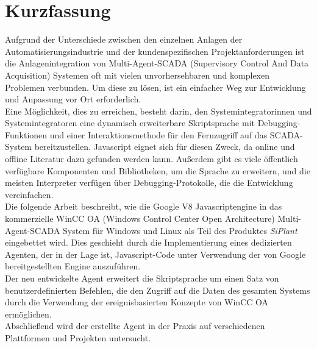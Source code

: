 \chapter{Kurzfassung}

Aufgrund der Unterschiede zwischen den einzelnen Anlagen der Automatisierungsindustrie und der 
kundenspezifischen Projektanforderungen ist die Anlagenintegration von Multi-Agent-SCADA 
(Supervisory Control And Data Acquisition) Systemen oft mit vielen unvorhersehbaren und komplexen Problemen verbunden. 
Um diese zu lösen, ist ein einfacher Weg zur Entwicklung und Anpassung vor Ort erforderlich. \\

Eine Möglichkeit, dies zu erreichen, besteht darin, den Systemintegratorinnen und Systemintegratoren eine dynamisch erweiterbare Skriptsprache mit 
Debugging-Funktionen und einer Interaktionsmethode für den Fernzugriff auf das SCADA-System bereitzustellen.
Javascript eignet sich für diesen Zweck, da online und offline Literatur dazu gefunden werden kann. Außerdem gibt es viele 
öffentlich verfügbare Komponenten und Bibliotheken, um die Sprache zu erweitern, und die meisten Interpreter 
verfügen über Debugging-Protokolle, die die Entwicklung vereinfachen. \\

Die folgende Arbeit beschreibt, wie die Google V8 Javascriptengine in das kommerzielle WinCC OA 
(Windows Control Center Open Architecture) Multi-Agent-SCADA System für Windows und Linux als Teil des
Produktes \textit{SiPlant} eingebettet wird. 
Dies geschieht durch die Implementierung eines dedizierten Agenten, der in der Lage ist, Javascript-Code unter Verwendung der
von Google bereitgestellten Engine auszuführen. \\

Der neu entwickelte Agent erweitert die Skriptsprache um einen Satz von benutzerdefinierten Befehlen, die den Zugriff 
auf die Daten des gesamten Systems durch die Verwendung der ereignisbasierten Konzepte von WinCC OA ermöglichen. \\

Abschließend wird der erstellte Agent in der Praxis auf verschiedenen Plattformen und Projekten untersucht.
